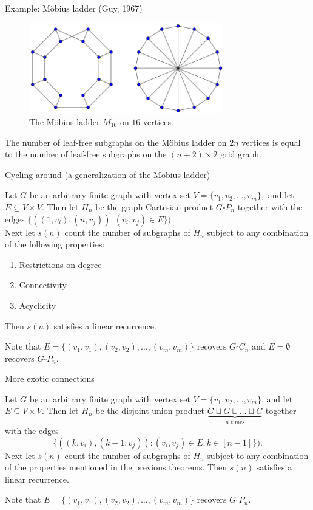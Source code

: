 \documentclass{beamer}%
\begin{document}
\begin{frame}{Example: M\"obius ladder (Guy, 1967)}
  \begin{figure}
    \includegraphics[width=240pt]{diagrams/Moebius-ladder-16.png}
    \caption{The M\"obius ladder $M_{16}$ on $16$ vertices.}
  \end{figure}
  \begin{fact}
    The number of leaf-free subgraphs on the M\"obius ladder on $2n$ vertices is
    equal to the number of leaf-free subgraphs on the $(n + 2) \times 2$ grid
    graph.
  \end{fact}
\end{frame}

\begin{frame}{Cycling around (a generalization of the M\"obius ladder)}
  \begin{theorem}
    Let $G$ be an arbitrary finite graph with vertex set
    $V = \{ v_1, v_2, \hdots, v_m \},$
    and let $E \subseteq V \times V$.
    Then let $H_n$ be the graph Cartesian product $G \square P_n$ together with
    the edges $\{((1, v_i), (n, v_j)) : (v_i, v_j) \in E\})$
    \\
    Next let $s(n)$ count the number of subgraphs of $H_n$
    subject to any combination of the following properties:
    \begin{enumerate}
      \item Restrictions on degree
      \item Connectivity
      \item Acyclicity
    \end{enumerate}
    Then $s(n)$ satisfies a linear recurrence.
  \end{theorem}
  Note that $E = \{(v_1, v_1), (v_2, v_2), \hdots, (v_m, v_m)\}$ recovers
  $G \square C_n$ and $E = \emptyset$ recovers $G \square P_n$.
\end{frame}

\begin{frame}{More exotic connections}
  \begin{theorem}
    Let $G$ be an arbitrary finite graph with vertex set
    $V = \{ v_1, v_2, \hdots, v_m \}$, and let $E \subseteq V \times V$.
    Then let $H_n$ be the disjoint union product
    $\underbrace{G \sqcup G \sqcup \hdots \sqcup G}_{n \text{ times}}$ together with the edges \[
      \{((k, v_i), (k + 1, v_j)) : (v_i, v_j) \in E, k \in [n-1]\}).
    \]
    Next let $s(n)$ count the number of subgraphs of $H_n$
    subject to any combination of the properties mentioned in the previous theorems.
    Then $s(n)$ satisfies a linear recurrence.
  \end{theorem}
  Note that $E = \{(v_1, v_1), (v_2, v_2), \hdots, (v_m, v_m)\}$ recovers
  $G \square P_n$.
\end{frame}
\end{document}
